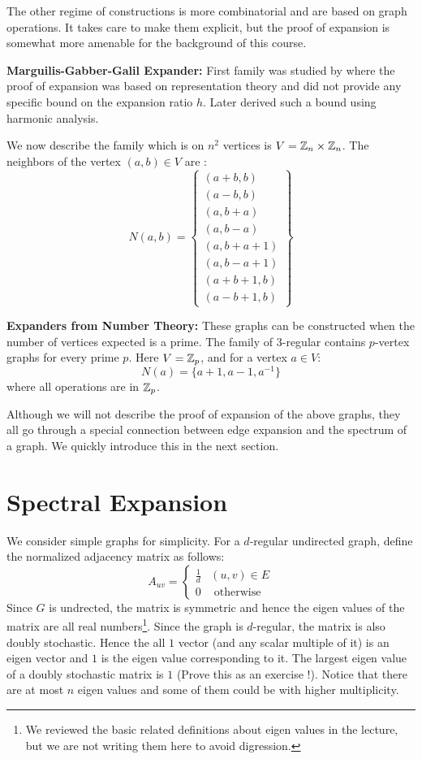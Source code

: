 The other regime of constructions is more combinatorial and are based on graph operations. It takes care to make them explicit, but the proof of expansion is somewhat more amenable for the background of this course.

\begin{description}
\item{\bf Marguilis-Gabber-Galil Expander:}
First family was studied by \cite{Mar73} where the proof of expansion was based on representation theory and did not provide any specific bound on the expansion ratio $h$. Later \cite{GG81} derived such a bound
using harmonic analysis.

We now describe the family which is on $n^2$ vertices 
is $V = {\mathbb{Z}}_n \times {\mathbb{Z}}_n$. The neighbors of the vertex $(a,b) \in V$ are :
$$N(a,b) = \left\{\begin{array}{l}
(a+b,b)\\
(a-b,b)\\
(a,b+a)\\
(a,b-a)\\
(a,b+a+1)\\
(a,b-a+1)\\
(a+b+1,b)\\
(a-b+1,b)
\end{array}
\right\}
$$
\item{\bf Expanders from Number Theory:}
These graphs can be constructed when the number of vertices expected is a prime. The family of $3$-regular contains $p$-vertex graphs for every prime $p$. Here $V = {\mathbb{Z}}_p$, and for a vertex $a \in V$: 
$$N(a) = \{a+1,a-1,a^{-1}\}$$
where all operations are in ${\mathbb{Z}}_p$.
\end{description}

Although we will not describe the proof of expansion of the above graphs, they all go through a special connection between edge expansion and the spectrum of a graph. We quickly introduce this in the next section.

\section{Spectral Expansion}
\label{sec:spectral-expansion}

We consider simple graphs for simplicity. For a $d$-regular undirected graph, define the normalized adjacency matrix as follows:
$$
A_{uv} = \left\{ \begin{array}{ll}
\frac{1}{d} & (u,v) \in E \\
0 & \textrm{ otherwise }
\end{array}
\right.
$$
Since $G$ is undrected, the matrix is symmetric and hence the eigen values of the matrix are all real numbers\footnote{We reviewed the basic related definitions about eigen values in the lecture, but we are not writing them here to avoid digression.}. Since the graph is $d$-regular, the matrix is also doubly stochastic. Hence the all $1$ vector (and any scalar multiple of it) is an eigen vector and $1$ is the eigen value corresponding to it. The largest eigen value of a doubly stochastic matrix is $1$ (Prove this as an exercise !). Notice that there are at most $n$ eigen values and some of them could be with higher multiplicity.

